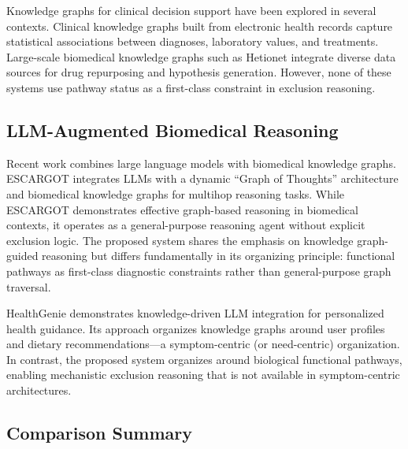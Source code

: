 \documentclass[12pt,a4paper]{article}
\begin{document}
Knowledge graphs for clinical decision support have been explored in several contexts. Clinical knowledge graphs built from electronic health records \citep{Rotmensch2017} capture statistical associations between diagnoses, laboratory values, and treatments. Large-scale biomedical knowledge graphs such as Hetionet \citep{Himmelstein2017} integrate diverse data sources for drug repurposing and hypothesis generation. However, none of these systems use pathway status as a first-class constraint in exclusion reasoning.

\subsection{LLM-Augmented Biomedical Reasoning}

Recent work combines large language models with biomedical knowledge graphs. ESCARGOT \citep{Matsumoto2025} integrates LLMs with a dynamic ``Graph of Thoughts'' architecture and biomedical knowledge graphs for multihop reasoning tasks. While ESCARGOT demonstrates effective graph-based reasoning in biomedical contexts, it operates as a general-purpose reasoning agent without explicit exclusion logic. The proposed system shares the emphasis on knowledge graph-guided reasoning but differs fundamentally in its organizing principle: functional pathways as first-class diagnostic constraints rather than general-purpose graph traversal.

HealthGenie \citep{Gao2025} demonstrates knowledge-driven LLM integration for personalized health guidance. Its approach organizes knowledge graphs around user profiles and dietary recommendations---a symptom-centric (or need-centric) organization. In contrast, the proposed system organizes around biological functional pathways, enabling mechanistic exclusion reasoning that is not available in symptom-centric architectures.

\subsection{Comparison Summary}
\end{document}
